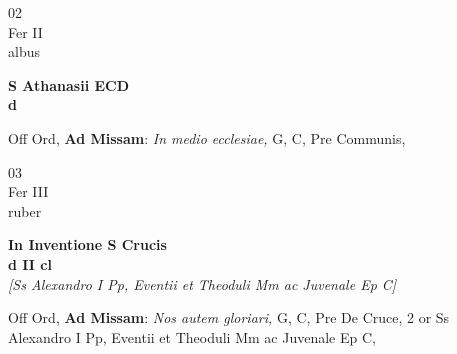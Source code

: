 \documentclass[10pt, openany]{book}
\begin{document}
        \begin{center}
            \begin{minipage}{3.5in}
                \vspace{2em}
                \begin{minipage}{0.5in}
                    {\Huge 02} \\
                    {\normalsize Fer II} \\
                    {\normalsize albus}
                \end{minipage}
                \begin{minipage}{3.0in}
                    \textbf{ \large S Athanasii ECD \\
                    \textnormal{\normalsize d}} \\ 
                \end{minipage}
                \begin{justify}Off Ord, \textbf{Ad Missam}: \textit{In medio ecclesiae,} G, C, Pre Communis,  
                \end{justify}
            \end{minipage}
        \end{center}
    
        \begin{center}
            \begin{minipage}{3.5in}
                \vspace{2em}
                \begin{minipage}{0.5in}
                    {\Huge 03} \\
                    {\normalsize Fer III} \\
                    {\normalsize ruber}
                \end{minipage}
                \begin{minipage}{3.0in}
                    \textbf{ \large In Inventione S Crucis \\
                    \textnormal{\normalsize d II cl}} \\ \textit{[Ss Alexandro I Pp, Eventii et Theoduli Mm ac Juvenale Ep C]} \\ 
                \end{minipage}
                \begin{justify}Off Ord, \textbf{Ad Missam}: \textit{Nos autem gloriari,} G, C, Pre De Cruce, 2 or Ss Alexandro I Pp, Eventii et Theoduli Mm ac Juvenale Ep C,  
                \end{justify}
            \end{minipage}
        \end{center}
    
\end{document}
